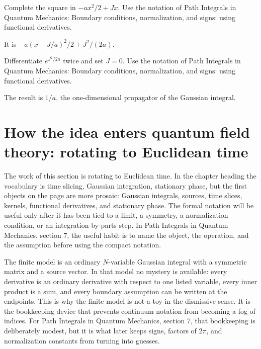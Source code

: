 \begin{exercise}
Complete the square in \(-ax^2/2+Jx\).  Use the notation of Path Integrals in Quantum Mechanics: Boundary conditions, normalization, and signs: using functional derivatives.
\begin{answer}
It is \(-a(x-J/a)^2/2+J^2/(2a)\).
\end{answer}
\end{exercise}

\begin{exercise}
Differentiate \(e^{J^2/2a}\) twice and set \(J=0\).  Use the notation of Path Integrals in Quantum Mechanics: Boundary conditions, normalization, and signs: using functional derivatives.
\begin{answer}
The result is \(1/a\), the one-dimensional propagator of the Gaussian integral.
\end{answer}
\end{exercise}



\section{How the idea enters quantum field theory: rotating to Euclidean time}

The work of this section is rotating to Euclidean time.  In the chapter heading the vocabulary is time slicing, Gaussian integration, stationary phase, but the first objects on the page are more prosaic: Gaussian integrals, sources, time slices, kernels, functional derivatives, and stationary phase.  The formal notation will be useful only after it has been tied to a limit, a symmetry, a normalization condition, or an integration-by-parts step.  In Path Integrals in Quantum Mechanics, section 7, the useful habit is to name the object, the operation, and the assumption before using the compact notation.

The finite model is an ordinary \(N\)-variable Gaussian integral with a symmetric matrix and a source vector.  In that model no mystery is available: every derivative is an ordinary derivative with respect to one listed variable, every inner product is a sum, and every boundary assumption can be written at the endpoints.  This is why the finite model is not a toy in the dismissive sense.  It is the bookkeeping device that prevents continuum notation from becoming a fog of indices.  For Path Integrals in Quantum Mechanics, section 7, that bookkeeping is deliberately modest, but it is what later keeps signs, factors of \(2\pi\), and normalization constants from turning into guesses.

